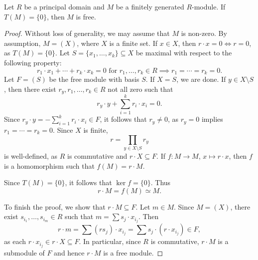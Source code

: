 \begin{theorem}
Let $R$ be a principal domain and 
$M$ be a finitely generated $R$-module. If
$T(M)=\{0\}$, then $M$ is free. 
\end{theorem}

\begin{proof}
Without loss of generality, we may assume that $M$ is non-zero.
By assumption, $M=(X)$, where $X$ is a finite set. 
If $x\in X$, then $r\cdot x=0\Longleftrightarrow r=0$, as $T(M)=\{0\}$. 
Let $S=\{x_1,\dots,x_k\}\subseteq X$ 
be maximal with respect to the following property:
\[
r_1\cdot x_1+\cdots+r_k\cdot x_k=0\text{ for $r_1,\dots,r_k\in R$}\implies r_1=\cdots=r_k=0.
\]	
Let $F=(S)$ be the free module with basis $S$. If $X=S$, we are done. 
If $y\in X\setminus S$, then
there exist $r_y,r_1,\dots,r_k\in R$ not all zero such that 
\[
r_y\cdot y+\sum_{i=1}^k r_i\cdot x_i=0.
\]
Since $r_y\cdot y=-\sum_{i=1}^k r_i\cdot x_i\in F$, it follows that
$r_y\ne 0$, as  
$r_y=0$ implies $r_1=\cdots=r_k=0$. Since $X$ is finite, 
\[
r=\prod_{y\in X\setminus S}r_y
\]
is well-defined, as $R$ is commutative and 
$r\cdot X\subseteq F$. If $f\colon M\to M$, $x\mapsto r\cdot x$, then
$f$ is a homomorphism such that $f(M)=r\cdot M$.

Since $T(M)=\{0\}$, it follows that
$\ker f=\{0\}$. Thus 
\[
r\cdot M=f(M)\simeq M.
\]

To finish the proof, we show that $r\cdot M\subseteq F$. Let $m\in M$. Since $M=(X)$, there exist $s_{i_1},\dots,s_{i_m}\in R$
such that 
$m=\sum s_j\cdot x_{i_j}$. Then 
\[
r\cdot m=\sum (rs_{j})\cdot x_{i_j}=\sum s_{j}\cdot (r\cdot x_{i_j})\in F,
\]
as each $r\cdot x_{i_j}\in r\cdot X\subseteq F$. In particular, since 
$R$ is commutative, $r\cdot M$ is a submodule of $F$ and hence $r\cdot M$ is a free module.  
\end{proof}



